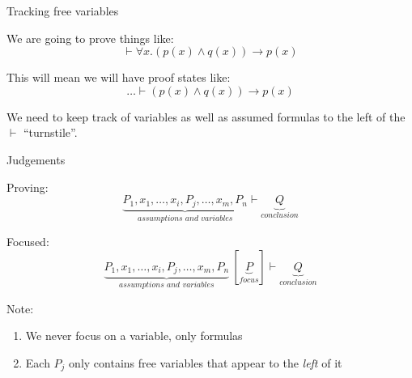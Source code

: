 \documentclass[xetex,aspectratio=169,14pt,hyperref={pdfpagelabels=true,pdflang={en-GB}}]{beamer}
\begin{document}
\frame{\titlepage}


\begin{frame}[t]
  {Tracking free variables}

  \bigskip

  We are going to prove things like:
  \begin{displaymath}
    \vdash \forall x. (p(x) \land q(x)) \to p(x)
  \end{displaymath}

  \bigskip

  This will mean we will have proof states like:
  \begin{displaymath}
    \dots \vdash (p(x) \land q(x)) \to p(x)
  \end{displaymath}

  We need to keep track of variables as well as assumed formulas to
  the left of the $\vdash$ ``turnstile''.
\end{frame}

\begin{frame}
  {Judgements}

  Proving:
  \begin{displaymath}
    \underbrace{P_1, x_1, \dots, x_i, P_j, \dots, x_m, P_n}_{\textit{assumptions and variables}} \vdash \underbrace{Q}_{\textit{conclusion}}
  \end{displaymath}

  Focused:
  \begin{displaymath}
    \underbrace{P_1, x_1, \dots, x_i, P_j, \dots, x_m, P_n}_{\textit{assumptions and variables}}~[\underbrace{P}_{\textit{focus}}] \vdash \underbrace{Q}_{\textit{conclusion}}
  \end{displaymath}

  Note:
  \begin{enumerate}
  \item We never focus on a variable, only formulas
  \item Each $P_j$ only contains free variables that appear to the
    \emph{left} of it
  \end{enumerate}
\end{frame}
\end{document}
